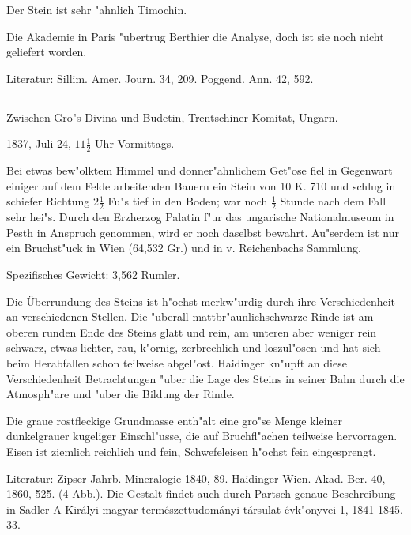 \documentclass[a4paper, 11pt, oneside]{article}
\begin{document}
Der Stein ist sehr "ahnlich Timochin.

Die Akademie in Paris "ubertrug Berthier die Analyse, doch ist sie noch nicht geliefert worden.

\normalsize
Literatur: Sillim. Amer. Journ. 34, 209. Poggend. Ann. 42, 592.

\subsection{}
\LARGE
\paragraph{}
Zwischen Gro"s-Divina und Budetin, Trentschiner Komitat, Ungarn.

1837, Juli 24, $\mathfrak{11\frac{1}{2}}$ Uhr Vormittags.

Bei etwas bew"olktem Himmel und donner"ahnlichem Get"ose fiel in Gegenwart einiger auf dem Felde arbeitenden Bauern ein Stein von 10 K. 710 und schlug in schiefer Richtung $\mathfrak{2\frac{1}{2}}$ Fu"s tief in den Boden; war noch $\mathfrak{\frac{1}{2}}$ Stunde nach dem Fall sehr hei"s. Durch den Erzherzog Palatin f"ur das ungarische Nationalmuseum in Pesth in Anspruch genommen, wird er noch daselbst bewahrt. Au"serdem ist nur ein Bruchst"uck in Wien (64,532 Gr.) und in v. Reichenbachs Sammlung.

Spezifisches Gewicht: 3,562 Rumler.

Die Überrundung des Steins ist h"ochst merkw"urdig durch ihre Verschiedenheit an verschiedenen Stellen. Die "uberall mattbr"aunlichschwarze Rinde ist am oberen runden Ende des Steins glatt und rein, am unteren aber weniger rein schwarz, etwas lichter, rau, k"ornig, zerbrechlich und loszul"osen und hat sich beim Herabfallen schon teilweise abgel"ost. Haidinger kn"upft an diese Verschiedenheit Betrachtungen "uber die Lage des Steins in seiner Bahn durch die Atmosph"are und "uber die Bildung der Rinde.

Die graue rostfleckige Grundmasse enth"alt eine gro"se Menge kleiner dunkelgrauer kugeliger Einschl"usse, die auf Bruchfl"achen teilweise hervorragen. Eisen ist ziemlich reichlich und fein, Schwefeleisen h"ochst fein eingesprengt.

\normalsize
Literatur: Zipser Jahrb. Mineralogie 1840, 89. Haidinger Wien. Akad. Ber. 40, 1860, 525. (4 Abb.). Die Gestalt findet auch durch Partsch genaue Beschreibung in Sadler A Királyi magyar természettudományi társulat évk"onyvei 1, 1841-1845. 33.
\end{document}
